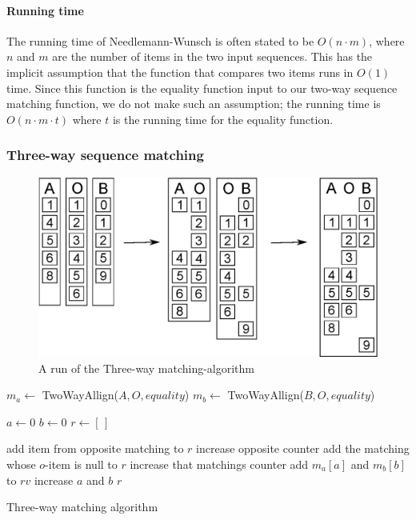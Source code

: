 \documentclass[11pt]{article}
\begin{document}
\paragraph{Running time} The running time of Needlemann-Wunsch is often stated to be $O(n \cdot m)$, where $n$ and $m$ are the number of items in the two input sequences. This has the implicit assumption that the function that compares two items runs in $O(1)$ time. Since this function is the equality function input to our two-way sequence matching function, we do not make such an assumption; the running time is $O(n \cdot m \cdot t)$ where $t$ is the running time for the equality function.

\subsubsection{Three-way sequence matching}
\begin{figure}
   \centerline{\includegraphics[scale=0.6]{drawings/eps/threewaymatching.eps}}
   \caption{A run of the Three-way matching-algorithm}
   \label{ThreewayMatching}
\end{figure}

\begin{algorithm}
\begin{algorithmic}
	\State $m_a\gets$ TwoWayAllign($A, O, equality$)
	\State $m_b\gets$ TwoWayAllign($B, O, equality$)
	
	\State $a \gets 0$
	\State $b \gets 0$
	\State $r \gets [\,]$
	
			\State add item from opposite matching to $r$
			\State increase opposite counter
			\State add the matching whose $o$-item is null to $r$
			\State increase that matchings counter
		\Else
			\State add $m_a[a]$ and $m_b[b]$ to $rv$
			\State increase $a$ and $b$
		\EndIf
	\EndWhile
	\State \Return $r$
	
\EndFunction
\end{algorithmic}
\caption{Three-way matching algorithm}
  \label{ThreeWayMatchingAlgorithm}
\end{algorithm}
\end{document}
